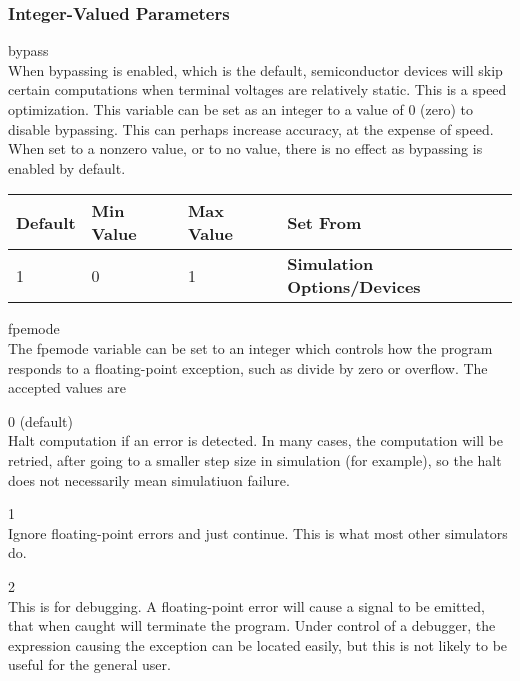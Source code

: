 \subsubsection{Integer-Valued Parameters}

\begin{description}
\item{\et bypass}\\
When bypassing is enabled, which is the default, semiconductor devices
will skip certain computations when terminal voltages are relatively
static.  This is a speed optimization.  This variable can be set as an
integer to a value of 0 (zero) to disable bypassing.  This can perhaps
increase accuracy, at the expense of speed.  When set to a nonzero
value, or to no value, there is no effect as bypassing is enabled by
default.

\begin{tabular}{|l|l|l|l|}\hline
\bf Default & \bf Min Value & \bf Max Value & \bf Set From\\ \hline
1 & 0 & 1 & \bf Simulation Options/Devices\\ \hline
\end{tabular}

\item{\et fpemode}\\
The {\et fpemode} variable can be set to an integer which controls how
the program responds to a floating-point exception, such as divide by
zero or overflow.  The accepted values are

\begin{description}
\item{0 (default)}\\
Halt computation if an error is detected.  In many cases, the
computation will be retried, after going to a smaller step size in
simulation (for example), so the halt does not necessarily mean
simulatiuon failure.

\item{1}\\
Ignore floating-point errors and just continue.  This is what most
other simulators do.

\item{2}\\
This is for debugging.  A floating-point error will cause a signal
to be emitted, that when caught will terminate the program.  Under
control of a debugger, the expression causing the exception can be
located easily, but this is not likely to be useful for the
general user.
\end{description}


\end{description}
